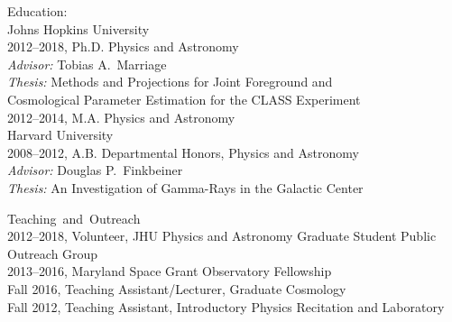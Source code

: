 \documentclass[a4paper]{resume}
\begin{document}
\begin{category}{Education:}
\citemnobullet\\
Johns Hopkins University \\
2012--2018, Ph.D. Physics and Astronomy\\
\qquad \textsl{Advisor:} Tobias A.~Marriage\\
\qquad \textsl{Thesis:} Methods and Projections for Joint Foreground
and\\
\qquad {} Cosmological Parameter Estimation
for the CLASS Experiment\\
2012--2014, M.A. Physics and Astronomy \\

\citemnobullet
Harvard University\\
2008--2012, A.B. Departmental Honors, Physics and Astronomy\\
\qquad \textsl{Advisor:} Douglas P.~Finkbeiner\\
\qquad \textsl{Thesis:} An Investigation of Gamma-Rays in the Galactic
Center
\end{category}




\begin{category}{\mbox{Teaching and Outreach}}
  \citemnobullet\\
2012--2018, Volunteer, JHU Physics and Astronomy Graduate Student Public Outreach Group\\
2013--2016, Maryland Space Grant Observatory Fellowship\\
Fall 2016, Teaching Assistant/Lecturer, Graduate Cosmology\\
Fall 2012, Teaching Assistant, Introductory Physics Recitation and Laboratory
\end{category}
\end{document}
